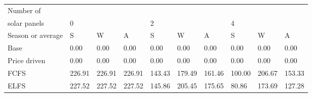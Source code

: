 \begin{table}[h] 
\centering 
\begin{tabular}{l|lll|lll|lll}Number of \\ solar panels&0& & &2& & &4& & \\ \hline 
Season or average & S & W & A & S & W & A & S & W & A \\ \hline 
Base&0.00&0.00&0.00&0.00&0.00&0.00&0.00&0.00&0.00 \\ 
Price driven&0.00&0.00&0.00&0.00&0.00&0.00&0.00&0.00&0.00 \\ 
FCFS&226.91&226.91&226.91&143.43&179.49&161.46&100.00&206.67&153.33 \\ 
ELFS&227.52&227.52&227.52&145.86&205.45&175.65&80.86&173.69&127.28 \\ 
\end{tabular} 
\end{table}